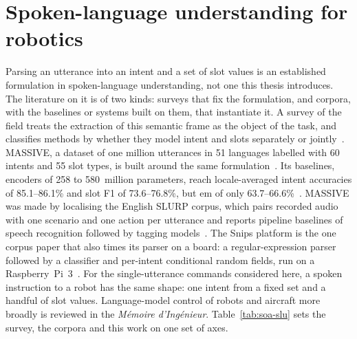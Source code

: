 \section{Spoken-language understanding for robotics}
\label{sec:soa-slu}
Parsing an utterance into an intent and a set of slot values is an established formulation in
spoken-language understanding, not one this thesis introduces. The literature on it is of two
kinds: surveys that fix the formulation, and corpora, with the baselines or systems built on
them, that instantiate it. A
survey of the field treats the extraction of this semantic frame as the object of the task, and
classifies methods by whether they model intent and slots separately or jointly~\cite{qin2021}.
MASSIVE, a dataset of one million utterances in 51 languages labelled with 60 intents and 55 slot
types, is built around the same formulation~\cite{massive}. Its baselines, encoders of 258 to
580~million parameters, reach locale-averaged intent accuracies of 85.1--86.1\% and slot F1 of
73.6--76.8\%, but \gls{em} of only 63.7--66.6\%~\cite{massive}. MASSIVE was made by localising the
English SLURP corpus, which pairs recorded audio with one scenario and one action per utterance
and reports pipeline baselines of speech recognition followed by tagging
models~\cite{massive,slurp2020}. The Snips platform is the one corpus paper that also times its
parser on a board: a regular-expression parser followed by a classifier and per-intent
conditional random fields, run on a Raspberry~Pi~3~\cite{snips2018}. For the single-utterance commands
considered here, a spoken instruction to a robot has the same shape: one intent from a fixed set
and a handful of slot values. Language-model control of robots and aircraft more broadly is
reviewed in the \emph{M\'emoire d'Ing\'enieur}. Table~\ref{tab:soa-slu} sets the survey, the
corpora and this work on one set of axes.

